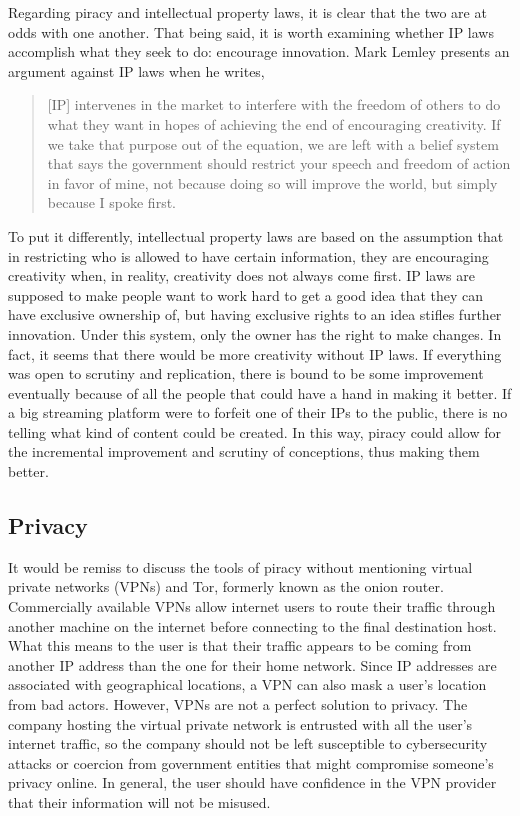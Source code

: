 \documentclass[onecolumn, 12pt]{article}
\begin{document}
\begin{refsection}
Regarding piracy and intellectual property laws, it is clear that the two are at odds with
one another. That being said, it is worth examining whether IP laws accomplish what they
seek to do: encourage innovation. Mark Lemley presents an argument against IP laws when he
writes, \blockcquote[1339]{lemley:faith-based}{[IP] intervenes in the market to interfere
with the freedom of others to do what they want in hopes of achieving the end of
encouraging creativity. If we take that purpose out of the equation, we are left with a
belief system that says the government should restrict your speech and freedom of action
in favor of mine, not because doing so will improve the world, but simply because I spoke
first.} 
To put it differently, intellectual property laws are based on the assumption that in
restricting who is allowed to have certain information, they are encouraging creativity
when, in reality, creativity does not always come first. IP laws are supposed to make
people want to work hard to get a good idea that they can have exclusive ownership of, but
having exclusive rights to an idea stifles further innovation. Under this system, only the
owner has the right to make changes. In fact, it seems that there would be more creativity
without IP laws. If everything was open to scrutiny and replication, there is bound to be
some improvement eventually because of all the people that could have a hand in making it
better. If a big streaming platform were to forfeit one of their IPs to the public, there
is no telling what kind of content could be created. In this way, piracy could allow for
the incremental improvement and scrutiny of conceptions, thus making them better.

\subsection{Privacy}
It would be remiss to discuss the tools of piracy without mentioning virtual private
networks (VPNs) and Tor, formerly known as the onion router. Commercially available VPNs
allow internet users to route their traffic through another machine on the internet before
connecting to the final destination host. What this means to the user is that their
traffic appears to be coming from another IP address than the one for their home network.
Since IP addresses are associated with geographical locations, a VPN can also mask a
user's location from bad actors. However, VPNs are not a perfect solution to privacy. The
company hosting the virtual private network is entrusted with all the user's internet
traffic, so the company should not be left susceptible to cybersecurity attacks or
coercion from government entities that might compromise someone's privacy online. In
general, the user should have confidence in the VPN provider that their information will
not be misused.


\end{refsection}
\end{document}

